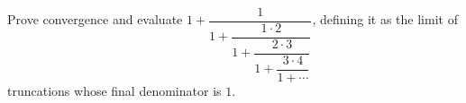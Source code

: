 Prove convergence and evaluate $1+\dfrac{1}{1+\dfrac{1\cdot2}{1+\dfrac{2\cdot3}{1+\dfrac{3\cdot4}{1+\cdots}}}}$, defining it as the limit of truncations whose final denominator is $1$.
